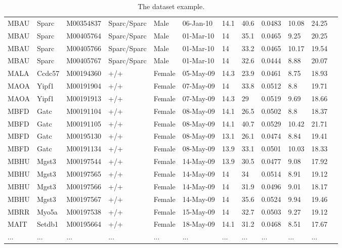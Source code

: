 \documentclass[12pt,a4paper]{article}
\begin{document}
\begin{table}
\begin{tabular}{| p{13mm} | p{13mm} | l | l | l | p{19mm}| p{12mm} | l | p{13mm} | p{12mm} | p{12mm} | l |}
MBAU&Sparc&M00354837&Sparc/Sparc&Male&06-Jan-10&14.1&40.6&0.0483&10.08&24.25&\\
MBAU&Sparc&M00405764&Sparc/Sparc&Male&01-Mar-10&14&35.1&0.0465&9.25&20.25&\\
MBAU&Sparc&M00405766&Sparc/Sparc&Male&01-Mar-10&14&33.2&0.0465&10.17&19.54&\\
MBAU&Sparc&M00405767&Sparc/Sparc&Male&01-Mar-10&14&32.6&0.0444&8.88&20.07&\\
MALA&Ccdc57&M00194360&+/+&Female&05-May-09&14.3&23.9&0.0461&8.75&18.93&\\
MAOA&Yipf1&M00191904&+/+&Female&07-May-09&14&33.8&0.0512&8.8&19.71&\\
MAOA&Yipf1&M00191913&+/+&Female&07-May-09&14.3&29&0.0519&9.69&18.66&\\
MBFD&Gatc&M00191104&+/+&Female&08-May-09&14.1&26.5&0.0502&8.8&18.37&\\
MBFD&Gatc&M00191105&+/+&Female&08-May-09&14.1&40.7&0.0529&10.42&21.71&\\
MBFD&Gatc&M00195130&+/+&Female&08-May-09&13.1&26.1&0.0474&8.84&19.41&\\
MBFD&Gatc&M00191134&+/+&Female&08-May-09&13.9&33.1&0.0501&10.03&18.33&\\
MBHU&Mgst3&M00197544&+/+&Female&14-May-09&13.9&30.5&0.0477&9.08&17.92&\\
MBHU&Mgst3&M00197565&+/+&Female&14-May-09&14&34&0.0514&8.91&19.12&\\
MBHU&Mgst3&M00197566&+/+&Female&14-May-09&14&31.9&0.0496&9.01&18.17&\\
MBHU&Mgst3&M00197567&+/+&Female&14-May-09&14&35.6&0.0524&9.94&19.46&\\
MBRR&Myo5a&M00197538&+/+&Female&15-May-09&14&32.7&0.0503&9.27&19.12&\\
MAIT&Setdb1&M00195664&+/+&Female&18-May-09&14.1&31.2&0.0468&8.51&17.67&\\
...&...&...&...&...&...&...&...&...&...&...&\\
\hline  
\end{tabular}
\caption{The dataset example.}\label{table:01}
\end{table}
\end{document}
